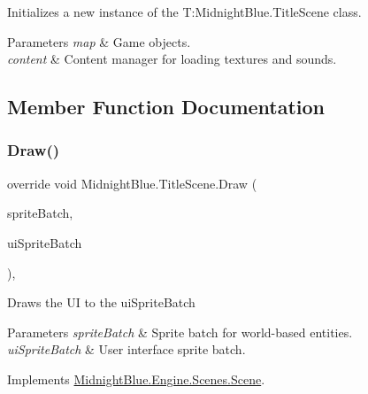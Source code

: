 Initializes a new instance of the T\+:\+Midnight\+Blue.\+Title\+Scene class. 


\begin{DoxyParams}{Parameters}
{\em map} & Game objects.\\
\hline
{\em content} & Content manager for loading textures and sounds.\\
\hline
\end{DoxyParams}


\subsection{Member Function Documentation}
\hypertarget{class_midnight_blue_1_1_title_scene_a03fa806a36226ec5fd0ce09870109c18}{}\label{class_midnight_blue_1_1_title_scene_a03fa806a36226ec5fd0ce09870109c18} 
\subsubsection{\texorpdfstring{Draw()}{Draw()}}
{\footnotesize\ttfamily override void Midnight\+Blue.\+Title\+Scene.\+Draw (\begin{DoxyParamCaption}\item[{Sprite\+Batch}]{sprite\+Batch,  }\item[{Sprite\+Batch}]{ui\+Sprite\+Batch }\end{DoxyParamCaption})\hspace{0.3cm}{\ttfamily [inline]}, {\ttfamily [virtual]}}



Draws the UI to the ui\+Sprite\+Batch 


\begin{DoxyParams}{Parameters}
{\em sprite\+Batch} & Sprite batch for world-\/based entities.\\
\hline
{\em ui\+Sprite\+Batch} & User interface sprite batch.\\
\hline
\end{DoxyParams}


Implements \hyperlink{class_midnight_blue_1_1_engine_1_1_scenes_1_1_scene_a6ec0b4be6c7dc226c9afd308e1fb3fd3}{Midnight\+Blue.\+Engine.\+Scenes.\+Scene}.

